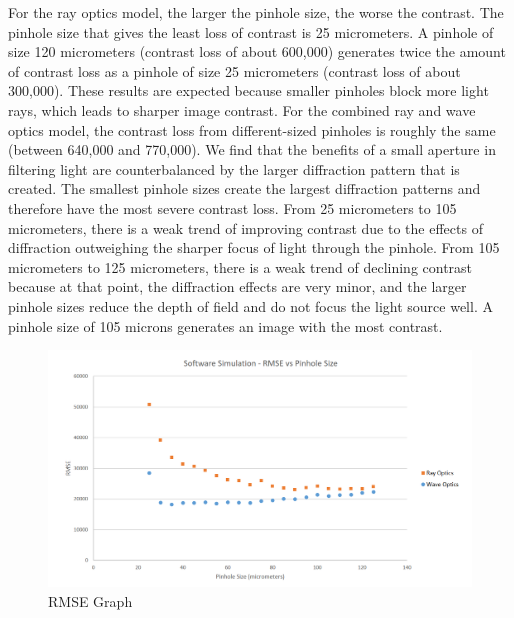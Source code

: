 For the ray optics model, the larger the pinhole size, the worse the contrast. The pinhole size that gives the least loss of contrast is 25 micrometers. A pinhole of size 120 micrometers (contrast loss of about 600,000) generates twice the amount of contrast loss as a pinhole of size 25 micrometers (contrast loss of about 300,000). These results are expected because smaller pinholes block more light rays, which leads to sharper image contrast. For the combined ray and wave optics model, the contrast loss from different-sized pinholes is roughly the same (between 640,000 and 770,000). We find that the benefits of a small aperture in filtering light are counterbalanced by the larger diffraction pattern that is created. The smallest pinhole sizes create the largest diffraction patterns and therefore have the most severe contrast loss. From 25 micrometers to 105 micrometers, there is a weak trend of improving contrast due to the effects of diffraction outweighing the sharper focus of light through the pinhole. From 105 micrometers to 125 micrometers, there is a weak trend of declining contrast because at that point, the diffraction effects are very minor, and the larger pinhole sizes reduce the depth of field and do not focus the light source well. A pinhole size of 105 microns generates an image with the most contrast.

\begin{figure}[ht]
  \centering
  \includegraphics[width=7.0in]{chapters/chapter8/images/RMSE.png}
  \caption{RMSE Graph}
  \label{fig:ferrari}
\end{figure}

